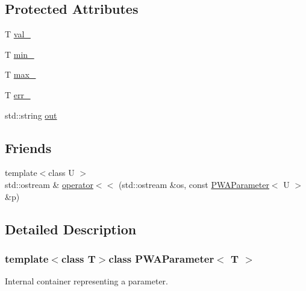 \subsection*{Protected Attributes}
\begin{DoxyCompactItemize}
\item 
T \hyperlink{classPWAParameter_a340ff1428a7859762b83ee9f607b45b5}{val\_\-}
\item 
T \hyperlink{classPWAParameter_aafd4f577aa33a901f7ed8e7544158af0}{min\_\-}
\item 
T \hyperlink{classPWAParameter_a6baf4acd771fc311860d1f8c5ff01026}{max\_\-}
\item 
T \hyperlink{classPWAParameter_acea642e8ce9666a54bcecffc573acbde}{err\_\-}
\item 
std::string \hyperlink{classPWAParameter_aa2b305c00ce772a886f23cabe1170a08}{out}
\end{DoxyCompactItemize}
\subsection*{Friends}
\begin{DoxyCompactItemize}
\item 
{\footnotesize template$<$class U $>$ }\\std::ostream \& \hyperlink{classPWAParameter_a22f81859f3803c4acbd53ccf03d50780}{operator$<$$<$} (std::ostream \&os, const \hyperlink{classPWAParameter}{PWAParameter}$<$ U $>$ \&p)
\end{DoxyCompactItemize}


\subsection{Detailed Description}
\subsubsection*{template$<$class T$>$class PWAParameter$<$ T $>$}

Internal container representing a parameter. 


